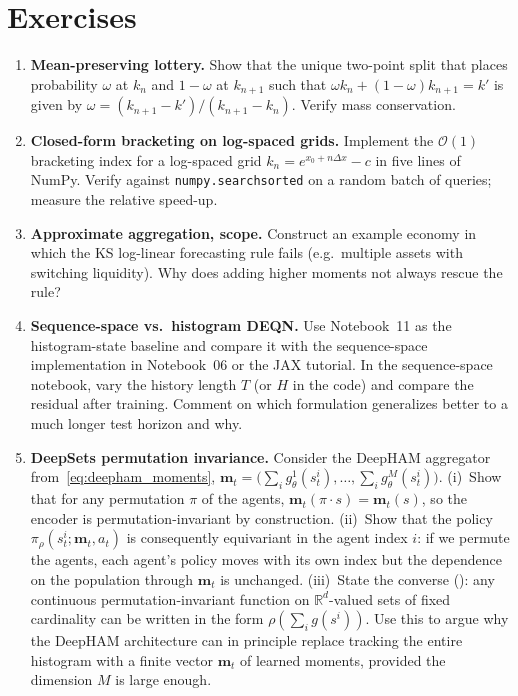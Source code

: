\documentclass[11pt,a4paper]{report}
\begin{document}
\section*{Exercises}
\begin{enumerate}[itemsep=4pt, leftmargin=*]
\item\label{ex:ch6:1} \textbf{Mean-preserving lottery.}  Show that the unique two-point split that places probability $\omega$ at $k_n$ and $1-\omega$ at $k_{n+1}$ such that $\omega k_n + (1-\omega) k_{n+1} = k'$ is given by $\omega = (k_{n+1} - k')/(k_{n+1} - k_n)$.  Verify mass conservation.
\item\label{ex:ch6:2} \textbf{Closed-form bracketing on log-spaced grids.}  Implement the $\mathcal{O}(1)$ bracketing index for a log-spaced grid $k_n = e^{x_0 + n\Delta x} - c$ in five lines of NumPy.  Verify against \texttt{numpy.searchsorted} on a random batch of queries; measure the relative speed-up.
\item\label{ex:ch6:3} \textbf{Approximate aggregation, scope.}  Construct an example economy in which the KS log-linear forecasting rule fails (e.g.\ multiple assets with switching liquidity).  Why does adding higher moments not always rescue the rule?
\item\label{ex:ch6:4} \textbf{Sequence-space vs.\ histogram DEQN.}  Use Notebook~11 as the histogram-state baseline and compare it with the sequence-space implementation in Notebook~06 or the JAX tutorial.  In the sequence-space notebook, vary the history length $T$ (or $H$ in the code) and compare the residual after training.  Comment on which formulation generalizes better to a much longer test horizon and why.
\item\label{ex:ch6:5} \textbf{DeepSets permutation invariance.}  Consider the DeepHAM aggregator from~\eqref{eq:deepham_moments}, $\bm{m}_t = \bigl(\sum_i g_\theta^1(s_t^i), \ldots, \sum_i g_\theta^M(s_t^i)\bigr)$.  (i)~Show that for any permutation $\pi$ of the agents, $\bm{m}_t(\pi \cdot s) = \bm{m}_t(s)$, so the encoder is permutation-invariant by construction.  (ii)~Show that the policy $\pi_\rho(s_t^i; \bm{m}_t, a_t)$ is consequently equivariant in the agent index $i$: if we permute the agents, each agent's policy moves with its own index but the dependence on the population through $\bm{m}_t$ is unchanged.  (iii)~State the converse (\citet{zaheer2017deep}): any continuous permutation-invariant function on $\mathbb{R}^d$-valued sets of fixed cardinality can be written in the form $\rho(\sum_i g(s^i))$.  Use this to argue why the DeepHAM architecture can in principle replace tracking the entire histogram with a finite vector $\bm{m}_t$ of learned moments, provided the dimension $M$ is large enough.

\end{enumerate}
\end{document}
